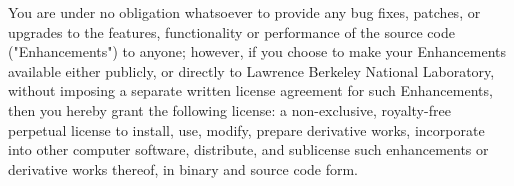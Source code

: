 \documentclass{article}
\begin{document}
You are under no obligation whatsoever to provide any bug fixes,
patches, or upgrades to the features, functionality or performance
of the source code ("Enhancements") to anyone; however, if you
choose to make your Enhancements available either publicly, or
directly to Lawrence Berkeley National Laboratory, without imposing
a separate written license agreement for such Enhancements, then you
hereby grant the following license: a non-exclusive, royalty-free
perpetual license to install, use, modify, prepare derivative works,
incorporate into other computer software, distribute, and sublicense
such enhancements or derivative works thereof, in binary and source
code form.


% 

\end{document}
